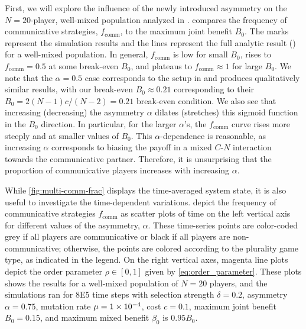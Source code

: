 \documentclass[pdflatex,twocolumn,sn-nature,super]{sn-jnl}
\begin{document}
First, we will explore the influence of the newly introduced asymmetry
on the $N=20$-player, well-mixed population analyzed in \tripp{}.
 compares the frequency of communicative strategies,
$f_{\text{comm}}$, to the maximum joint benefit $B_0$.
The marks represent the simulation results
and the lines represent the full analytic
result () for a well-mixed population.
In general, $f_{\text{comm}}$ is low for small $B_0$,
rises to $f_{\text{comm}} = 0.5$ at some break-even $B_0$,
and plateaus to $f_{\text{comm}} \approx 1$ for large $B_0$.
We note that the $\alpha = 0.5$ case corresponds
to the setup in \tripp{} and produces qualitatively similar results,
with our break-even $B_0 \approx 0.21$
corresponding to their $B_0 = 2 (N-1) c/(N-2) = 0.21$ break-even condition.
We also see that increasing (decreasing)
the asymmetry $\alpha$ dilates (stretches) this sigmoid function
in the $B_0$ direction.
In particular, for the larger $\alpha$'s, the $f_{\text{comm}}$ curve
rises more steeply and at smaller values of $B_0$.
This $\alpha$-dependence is reasonable,
as increasing $\alpha$ corresponds to biasing the payoff
in a mixed $C$-$N$ interaction towards the communicative partner.
Therefore, it is unsurprising that the proportion of communicative players
increases with increasing $\alpha$.

While \cref{fig:multi-comm-frac} displays
the time-averaged system state,
it is also useful to investigate the time-dependent variations.
depict the frequency
of communicative strategies $f_{\text{comm}}$
as scatter plots of time on the left vertical axis
for different values of the asymmetry, $\alpha$.
These time-series points are color-coded
grey if all players are communicative or
black if all players are non-communicative;
otherwise, the points are colored according
to the plurality game type, as indicated in the legend.
On the right vertical axes,
magenta line plots depict the order parameter
$\rho \in [0,1]$
given by \cref{eq:order_parameter}.
These plots shows the results
for a well-mixed population of $N=20$ players,
and the simulations ran
for \num{8E5} time steps with
selection strength $\delta = 0.2$,
asymmetry $\alpha = 0.75$,
mutation rate $\mu=\num{1E-4}$,
cost $c = \num{0.1}$,
maximum joint benefit $B_0 = 0.15$,
and maximum mixed benefit $\beta_0$ is $\num{0.95} B_0$.
\end{document}
